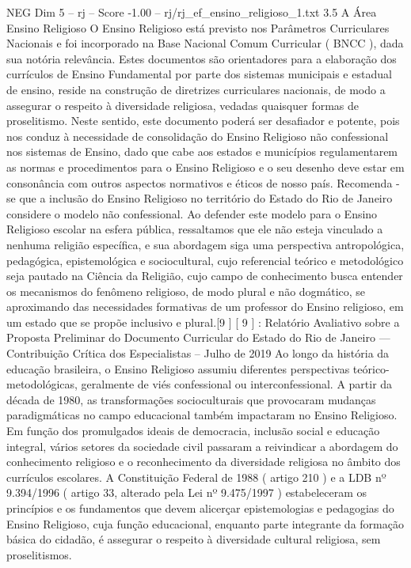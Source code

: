 \begin{textsample}{NEG Dim 5 – rj – Score -1.00 – rj/rj\_ef\_ensino\_religioso\_1.txt}  \label{ex:f5_neg_091}
3.5 A Área Ensino Religioso O Ensino Religioso está previsto nos Parâmetros Curriculares Nacionais e foi incorporado na Base Nacional Comum Curricular ( BNCC ), dada sua notória relevância.
Estes documentos são orientadores para a elaboração dos currículos de Ensino Fundamental por parte dos sistemas municipais e estadual de ensino, reside na construção de diretrizes curriculares nacionais, de modo a assegurar o respeito à diversidade religiosa, vedadas quaisquer formas de proselitismo.
Neste sentido, este documento poderá ser desafiador e potente, pois nos conduz à necessidade de consolidação do Ensino Religioso não confessional nos sistemas de Ensino, dado que cabe aos estados e municípios regulamentarem as normas e procedimentos para o Ensino Religioso e o seu desenho deve estar em consonância com outros aspectos normativos e éticos de nosso país.
Recomenda -se que a inclusão do Ensino Religioso no território do Estado do Rio de Janeiro considere o modelo não confessional.
Ao defender este modelo para o Ensino Religioso escolar na esfera pública, ressaltamos que ele não esteja vinculado a nenhuma religião específica, e sua abordagem siga uma perspectiva antropológica, pedagógica, epistemológica e sociocultural, cujo referencial teórico e metodológico seja pautado na Ciência da Religião, cujo campo de conhecimento busca entender os mecanismos do fenômeno religioso, de modo plural e não dogmático, se aproximando das necessidades formativas de um professor do Ensino religioso, em um estado que se propõe inclusivo e plural.[9 ] [ 9 ] : Relatório Avaliativo sobre a Proposta Preliminar do Documento Curricular do Estado do Rio de Janeiro — Contribuição Crítica dos Especialistas – Julho de 2019 Ao longo da história da educação brasileira, o Ensino Religioso assumiu diferentes perspectivas teórico-metodológicas, geralmente de viés confessional ou interconfessional.
A partir da década de 1980, as transformações socioculturais que provocaram mudanças paradigmáticas no campo educacional também impactaram no Ensino Religioso.
Em função dos promulgados ideais de democracia, inclusão social e educação integral, vários setores da sociedade civil passaram a reivindicar a abordagem do conhecimento religioso e o reconhecimento da diversidade religiosa no âmbito dos currículos escolares.
A Constituição Federal de 1988 ( artigo 210 ) e a LDB nº 9.394/1996 ( artigo 33, alterado pela Lei nº 9.475/1997 ) estabeleceram os princípios e os fundamentos que devem alicerçar epistemologias e pedagogias do Ensino Religioso, cuja função educacional, enquanto parte integrante da formação básica do cidadão, é assegurar o respeito à diversidade cultural religiosa, sem proselitismos.

\end{textsample}

